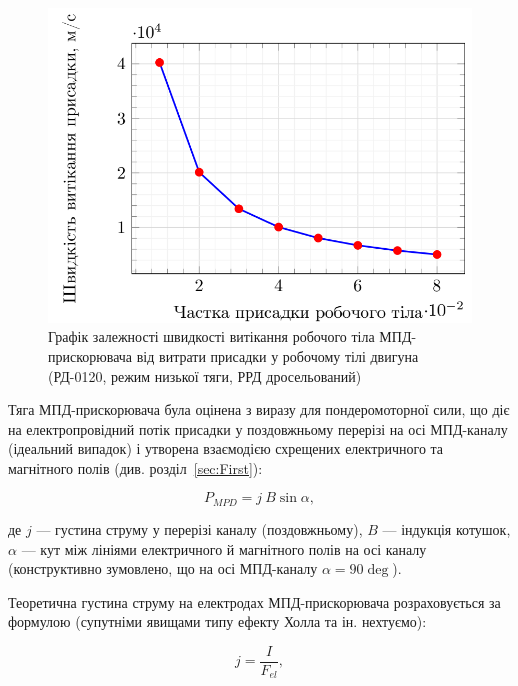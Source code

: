 
\begin{figure}
	\centering
	\includegraphics[width=0.5\textheight, angle=0,origin=c]{chapter_3/plot_Isp_WF.png}
	\caption{Графік залежності швидкості витікання робочого тіла МПД-прискорювача від витрати присадки у робочому тілі двигуна (РД-0120, режим низької тяги, РРД дросельований)}
	\label{fig:plot_Isp_WF}
\end{figure}

Тяга МПД-прискорювача була оцінена з виразу для пондеромоторної сили, що діє на електропровідний потік присадки у поздовжньому перерізі на осі МПД-каналу (ідеальний випадок) і утворена взаємодією схрещених електричного та магнітного полів (див. розділ~\ref{sec:First}):

\begin{equation*}
P_{MPD} = j~B \sin{\alpha},
\end{equation*}

де $j$ --- густина струму у перерізі каналу (поздовжньому), $B$ --- індукція котушок, $\alpha$ --- кут між лініями електричного й магнітного полів на осі каналу (конструктивно зумовлено, що на осі МПД-каналу $\alpha = 90\deg$).

Теоретична густина струму на електродах МПД-прискорювача розраховується за формулою (супутніми явищами типу ефекту Холла та ін. нехтуємо):

\begin{equation*}
	j = \frac{I}{F_{el}},
\end{equation*}

